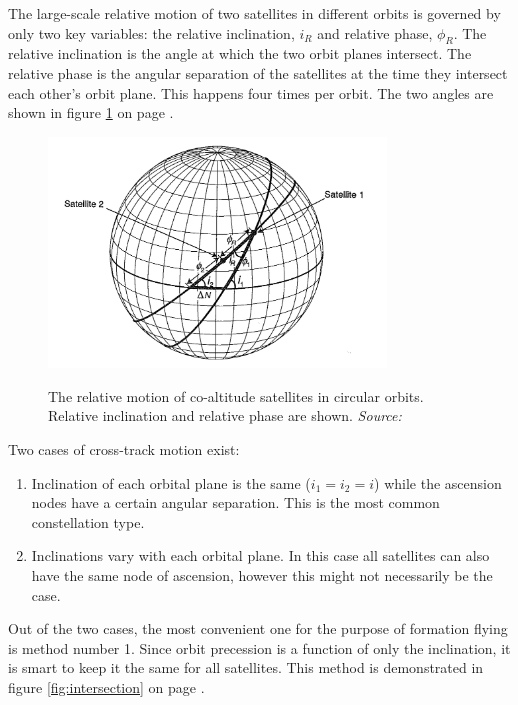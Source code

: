 \documentclass[11pt]{report}
\begin{document}
The large-scale relative motion of two satellites in different orbits is governed by only two key variables: the relative inclination, $i_R$ and relative phase, $\phi_R$. The relative inclination is the angle at which the two orbit planes intersect. The relative phase is the angular separation of the satellites at the time they intersect each other's orbit plane. This happens four times per orbit. The two angles are shown in figure \ref{fig:relativeMotion} on page \pageref{fig:relativeMotion}.

\begin{figure}[ht!]
\centering
\includegraphics[width=0.8\textwidth, angle=0]{img/relativeMotion.png}
\label{fig:relativeMotion}
\caption{The relative motion of co-altitude satellites in circular orbits. Relative inclination and relative phase are shown. \emph{Source: \cite{constDesign}}}
\end{figure}

Two cases of cross-track motion exist: 

\begin{enumerate}
	\item Inclination of each orbital plane is the same ($i_1 = i_2 = i$) while the ascension nodes have a certain angular separation. This is the most common constellation type.
	\item Inclinations vary with each orbital plane. In this case all satellites can also have the same node of ascension, however this might not necessarily be the case.
\end{enumerate}

Out of the two cases, the most convenient one for the purpose of formation flying is method number 1. Since orbit precession is a function of only the inclination, it is smart to keep it the same for all satellites. This method is demonstrated in figure \ref{fig:intersection} on page \pageref{fig:intersection}.
\end{document}
